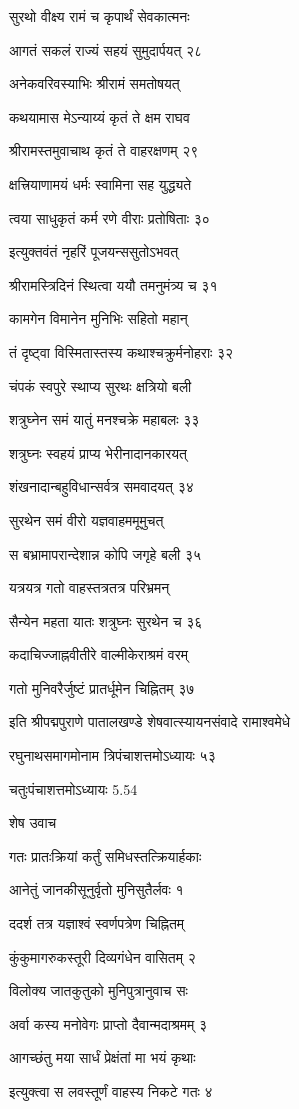 सुरथो वीक्ष्य रामं च कृपार्थं सेवकात्मनः

आगतं सकलं राज्यं सहयं सुमुदार्पयत् २८

अनेकवरिवस्याभिः श्रीरामं समतोषयत्

कथयामास मेऽन्याय्यं कृतं ते क्षम राघव

श्रीरामस्तमुवाचाथ कृतं ते वाहरक्षणम् २९

क्षत्त्रियाणामयं धर्मः स्वामिना सह युद्ध्यते

त्वया साधुकृतं कर्म रणे वीराः प्रतोषिताः ३०

इत्युक्तवंतं नृहरिं पूजयन्ससुतोऽभवत्

श्रीरामस्त्रिदिनं स्थित्वा ययौ तमनुमंत्र्य च ३१

कामगेन विमानेन मुनिभिः सहितो महान्

तं दृष्ट्वा विस्मितास्तस्य कथाश्चक्रुर्मनोहराः ३२

चंपकं स्वपुरे स्थाप्य सुरथः क्षत्रियो बली

शत्रुघ्नेन समं यातुं मनश्चक्रे महाबलः ३३

शत्रुघ्नः स्वहयं प्राप्य भेरीनादानकारयत्

शंखनादान्बहुविधान्सर्वत्र समवादयत् ३४

सुरथेन समं वीरो यज्ञवाहममूमुचत्

स बभ्रामापरान्देशान्न कोपि जगृहे बली ३५

यत्रयत्र गतो वाहस्तत्रतत्र परिभ्रमन्

सैन्येन महता यातः शत्रुघ्नः सुरथेन च ३६

कदाचिज्जाह्नवीतीरे वाल्मीकेराश्रमं वरम्

गतो मुनिवरैर्जुष्टं प्रातर्धूमेन चिह्नितम् ३७

इति श्रीपद्मपुराणे पातालखण्डे शेषवात्स्यायनसंवादे रामाश्वमेधे

रघुनाथसमागमोनाम त्रिपंचाशत्तमोऽध्यायः ५३

चतुःपंचाशत्तमोऽध्यायः 5.54

शेष उवाच

गतः प्रातःक्रियां कर्तुं समिधस्तत्क्रियार्हकाः

आनेतुं जानकीसूनुर्वृतो मुनिसुतैर्लवः १

ददर्श तत्र यज्ञाश्वं स्वर्णपत्रेण चिह्नितम्

कुंकुमागरुकस्तूरी दिव्यगंधेन वासितम् २

विलोक्य जातकुतुको मुनिपुत्रानुवाच सः

अर्वा कस्य मनोवेगः प्राप्तो दैवान्मदाश्रमम् ३

आगच्छंतु मया सार्धं प्रेक्षंतां मा भयं कृथाः

इत्युक्त्वा स लवस्तूर्णं वाहस्य निकटे गतः ४

